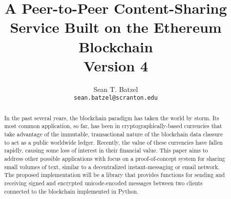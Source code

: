 \documentclass[]{article}
\title{A Peer-to-Peer Content-Sharing Service Built on the Ethereum Blockchain\\\large Version 4}
\author{Sean T. Batzel\\\texttt{sean.batzel@scranton.edu}}
\begin{document}
\maketitle
\tableofcontents

\pagebreak

\begin{abstract}
  In the past several years, the \gls{blockchain} paradigm has taken the world by storm. Its most common application, so far, has been in cryptographically-based currencies that take advantage of the immutable, transactional nature of the blockchain data classure to act as a public worldwide ledger. Recently, the value of these currencies have fallen rapidly, causing some loss of interest in their financial value. This paper aims to address other possible applications with focus on a proof-of-concept system for sharing small volumes of text, similar to a decentralized instant-messaging or email network. The proposed implementation will be a library that provides functions for sending and receiving signed and encrypted unicode-encoded messages between two clients connected to the blockchain implemented in Python.
\end{abstract}
\end{document}
